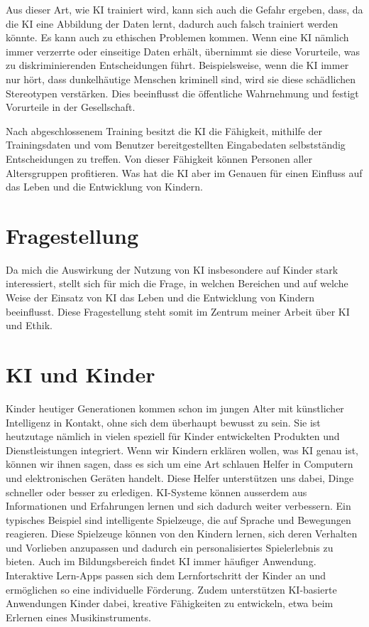 \documentclass{article}
\begin{document}
Aus dieser Art, wie KI trainiert wird, kann sich auch die Gefahr ergeben, dass, da die KI eine Abbildung der Daten lernt, dadurch auch falsch trainiert werden könnte. Es kann auch zu ethischen Problemen kommen.
Wenn eine KI nämlich immer verzerrte oder einseitige Daten erhält, übernimmt sie diese Vorurteile, was zu diskriminierenden Entscheidungen führt. Beispielsweise, wenn die KI immer nur hört, dass dunkelhäutige Menschen kriminell sind, wird sie diese schädlichen Stereotypen verstärken. Dies beeinflusst die öffentliche Wahrnehmung und festigt Vorurteile in der Gesellschaft.

Nach abgeschlossenem Training besitzt die KI die Fähigkeit, mithilfe der Trainingsdaten und vom Benutzer bereitgestellten Eingabedaten selbstständig Entscheidungen zu treffen. Von dieser Fähigkeit können Personen aller Altersgruppen profitieren. Was hat die KI aber im Genauen für einen Einfluss auf das Leben und die Entwicklung von Kindern.

\section{Fragestellung}

Da mich die Auswirkung der Nutzung von KI insbesondere auf Kinder stark interessiert, stellt sich für mich die Frage, in welchen Bereichen und auf welche Weise der Einsatz von KI das Leben und die Entwicklung von Kindern beeinflusst. Diese Fragestellung steht somit im Zentrum meiner Arbeit über KI und Ethik.

\section{KI und Kinder}

Kinder heutiger Generationen kommen schon im jungen Alter mit künstlicher Intelligenz in Kontakt, ohne sich dem überhaupt bewusst zu sein. Sie ist heutzutage nämlich in vielen speziell für Kinder entwickelten Produkten und Dienstleistungen integriert. Wenn wir Kindern erklären wollen, was KI genau ist, können wir ihnen sagen, dass es sich um eine Art schlauen Helfer in Computern und elektronischen Geräten handelt. Diese Helfer unterstützen uns dabei, Dinge schneller oder besser zu erledigen. KI-Systeme können ausserdem aus Informationen und Erfahrungen lernen und sich dadurch weiter verbessern.
Ein typisches Beispiel sind intelligente Spielzeuge, die auf Sprache und Bewegungen reagieren. Diese Spielzeuge können von den Kindern lernen, sich deren Verhalten und Vorlieben anzupassen und dadurch ein personalisiertes Spielerlebnis zu bieten.
Auch im Bildungsbereich findet KI immer häufiger Anwendung. Interaktive Lern-Apps passen sich dem Lernfortschritt der Kinder an und ermöglichen so eine individuelle Förderung. Zudem unterstützen KI-basierte Anwendungen Kinder dabei, kreative Fähigkeiten zu entwickeln, etwa beim Erlernen eines Musikinstruments.
\end{document}

